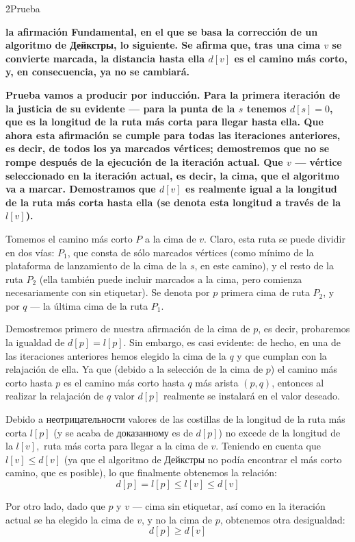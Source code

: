 \h2{Prueba}

\bf{la afirmación Fundamental}, en el que se basa la corrección de un algoritmo de Дейкстры, lo siguiente. Se afirma que, tras una cima $v$ se convierte marcada, la distancia hasta ella $d[v]$ es el camino más corto, y, en consecuencia, ya no se cambiará.

\bf{Prueba} vamos a producir por inducción. Para la primera iteración de la justicia de su evidente --- para la punta de la $s$ tenemos $d[s]=0$, que es la longitud de la ruta más corta para llegar hasta ella. Que ahora esta afirmación se cumple para todas las iteraciones anteriores, es decir, de todos los ya marcados vértices; demostremos que no se rompe después de la ejecución de la iteración actual. Que $v$ --- vértice seleccionado en la iteración actual, es decir, la cima, que el algoritmo va a marcar. Demostramos que $d[v]$ es realmente igual a la longitud de la ruta más corta hasta ella (se denota esta longitud a través de la $l[v]$).

Tomemos el camino más corto $P$ a la cima de $v$. Claro, esta ruta se puede dividir en dos vías: $P_1$, que consta de sólo marcados vértices (como mínimo de la plataforma de lanzamiento de la cima de la $s$, en este camino), y el resto de la ruta $P_2$ (ella también puede incluir marcados a la cima, pero comienza necesariamente con sin etiquetar). Se denota por $p$ primera cima de ruta $P_2$, y por $q$ --- la última cima de la ruta $P_1$.

Demostremos primero de nuestra afirmación de la cima de $p$, es decir, probaremos la igualdad de $d[p] = l[p]$. Sin embargo, es casi evidente: de hecho, en una de las iteraciones anteriores hemos elegido la cima de la $q$ y que cumplan con la relajación de ella. Ya que (debido a la selección de la cima de $p$) el camino más corto hasta $p$ es el camino más corto hasta $q$ más arista $(p,q)$, entonces al realizar la relajación de $q$ valor $d[p]$ realmente se instalará en el valor deseado.

Debido a неотрицательности valores de las costillas de la longitud de la ruta más corta $l[p]$ (y se acaba de доказанному es de $d[p]$) no excede de la longitud de la $l[v],$ ruta más corta para llegar a la cima de $v$. Teniendo en cuenta que $l[v] \le d[v]$ (ya que el algoritmo de Дейкстры no podía encontrar el más corto camino, que es posible), lo que finalmente obtenemos la relación:
$$ d[p] = l[p] \le l[v] \le d[v] $$

Por otro lado, dado que $p$ y $v$ --- cima sin etiquetar, así como en la iteración actual se ha elegido la cima de $v$, y no la cima de $p$, obtenemos otra desigualdad:
$$ d[p] \ge d[v] $$


